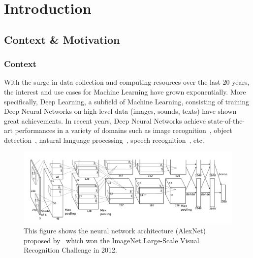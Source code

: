 \chapter{Introduction}
\label{chapter:introduction}
\localtableofcontents

\section{Context \& Motivation}
\label{section:ch1-context_and_motivation}

\subsection{Context}
\label{subsection:ch1-context}

With the surge in data collection and computing resources over the last 20 years, the interest and use cases for Machine Learning have grown exponentially.
More specifically, Deep Learning, a subfield of Machine Learning, consisting of training Deep Neural Networks on high-level
data (images, sounds, texts) have shown great achievements.
In recent years, Deep Neural Networks achieve state-of-the-art performances in a variety of domains such as image recognition~\cite{lecun1998gradient,krizhevsky2012imagenet,He_2016_CVPR,tan2019efficientnet}, object detection~\cite{redmon2016you,liu2016ssd,redmon2017yolo9000}, natural language processing~\cite{merity2016pointer,radford2018Language,brown2020language}, speech recognition~\cite{hinton2012deep,abdel2014convolutional,yu2016automatic}, etc.

\begin{figure}[t]
  \centering
  \includegraphics[scale=0.2]{figures/chapter1/alexnet.png}
  \caption{This figure shows the neural network architecture (AlexNet) proposed by~\citet{krizhevsky2012imagenet} which won the ImageNet Large-Scale Visual Recognition Challenge in 2012.}
  \label{figure:ch1-alexnet_network}
\end{figure}

